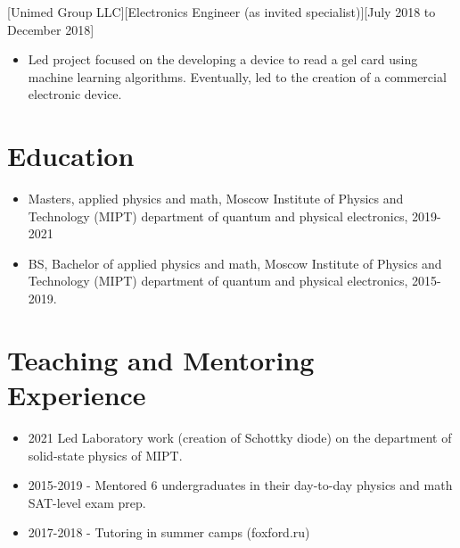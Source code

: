 \documentclass{article}
\begin{document}
 
 
 
[Unimed Group LLC][Electronics Engineer (as invited specialist)][July 2018 to December 2018]
 
\begin{itemize}
\item Led project focused on the developing a device to read a gel card using machine learning algorithms. Eventually, led to the creation of a commercial electronic device.
\end{itemize}
 
 
\section{Education}
 
\begin{itemize}
\item Masters, applied physics and math, Moscow Institute of Physics and Technology (MIPT) department of quantum and physical electronics, 2019-2021
\item BS, Bachelor of applied physics and math, Moscow Institute of Physics and Technology (MIPT) department of quantum and physical electronics, 2015-2019.
\end{itemize}

\section{Teaching and Mentoring Experience }
\begin{itemize}
\item 2021 Led Laboratory work (creation of Schottky diode) on the department of solid-state physics of MIPT. 
\item 2015-2019 - Mentored 6 undergraduates in their day-to-day physics and math SAT-level exam prep.
\item 2017-2018 - Tutoring in summer camps (foxford.ru)
\end{itemize}
 
\end{document}

